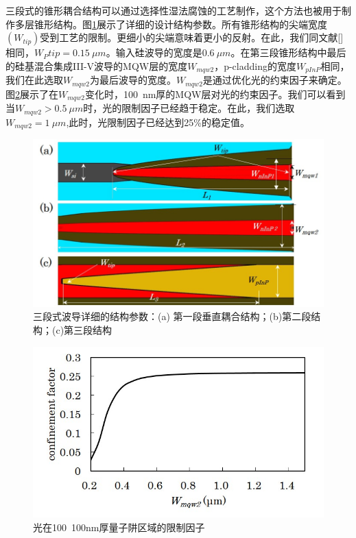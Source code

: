 三段式的锥形耦合结构可以通过选择性湿法腐蚀的工艺制作，这个方法也被用于制作多层锥形结构\cite{kurczveil2013characterization}。图\ref{fig_ch3_detail_structure}展示了详细的设计结构参数。所有锥形结构的尖端宽度$(W_{tip})$受到工艺的限制。更细小的尖端意味着更小的反射。在此，我们同文献[]相同，$W_P{tip} = 0.15~\mu m$。输入硅波导的宽度是$0.6~\mu m$。在第三段锥形结构中最后的硅基混合集成III-V波导的MQW层的宽度$W_{mqw2}$，p-cladding的宽度$W_{pInP}$相同，我们在此选取$W_{mqw2}$为最后波导的宽度。$W_{mqw2}$是通过优化光的约束因子来确定。图\ref{fig_ch3_confinement}展示了在$W_{mqw2}$变化时，100~nm厚的MQW层对光的约束因子。我们可以看到当$W_{mqw2} > 0.5~\mu m$时，光的限制因子已经趋于稳定。在此，我们选取$W_{mqw2} = 1 ~\mu m$,此时，光限制因子已经达到25\%的稳定值。

\begin{figure}[htb]
	\centering
	\includegraphics[width=12cm]{./Pictures/fig_ch3_detail_structure.jpg}
	\caption{三段式波导详细的结构参数：(a) 第一段垂直耦合结构；(b)第二段结构；(c)第三段结构}
	\label{fig_ch3_detail_structure}
\end{figure}

\begin{figure}[htb]
	\centering
	\includegraphics[width=12cm]{./Pictures/fig_ch3_confinement.jpg}
	\caption{光在100~100nm厚量子阱区域的限制因子}
	\label{fig_ch3_confinement}
\end{figure}

